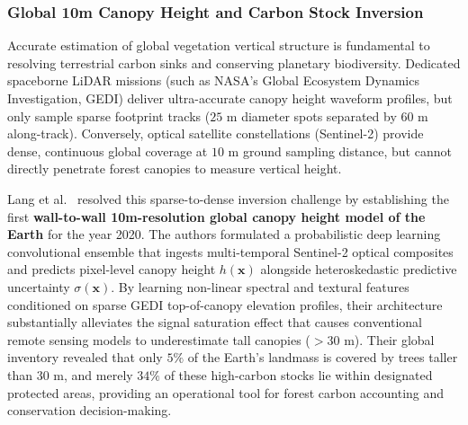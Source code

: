 \subsubsection{Global 10m Canopy Height and Carbon Stock Inversion}
Accurate estimation of global vegetation vertical structure is fundamental to resolving terrestrial carbon sinks and conserving planetary biodiversity. Dedicated spaceborne LiDAR missions (such as NASA's Global Ecosystem Dynamics Investigation, GEDI) deliver ultra-accurate canopy height waveform profiles, but only sample sparse footprint tracks ($25\text{ m}$ diameter spots separated by $60\text{ m}$ along-track). Conversely, optical satellite constellations (Sentinel-2) provide dense, continuous global coverage at $10\text{ m}$ ground sampling distance, but cannot directly penetrate forest canopies to measure vertical height.

Lang et al.~\cite{lang2023canopy} resolved this sparse-to-dense inversion challenge by establishing the first \textbf{wall-to-wall 10m-resolution global canopy height model of the Earth} for the year 2020. The authors formulated a probabilistic deep learning convolutional ensemble that ingests multi-temporal Sentinel-2 optical composites and predicts pixel-level canopy height $h(\mathbf{x})$ alongside heteroskedastic predictive uncertainty $\sigma(\mathbf{x})$. By learning non-linear spectral and textural features conditioned on sparse GEDI top-of-canopy elevation profiles, their architecture substantially alleviates the signal saturation effect that causes conventional remote sensing models to underestimate tall canopies ($> 30\text{ m}$). Their global inventory revealed that only $5\%$ of the Earth's landmass is covered by trees taller than $30\text{ m}$, and merely $34\%$ of these high-carbon stocks lie within designated protected areas, providing an operational tool for forest carbon accounting and conservation decision-making.

